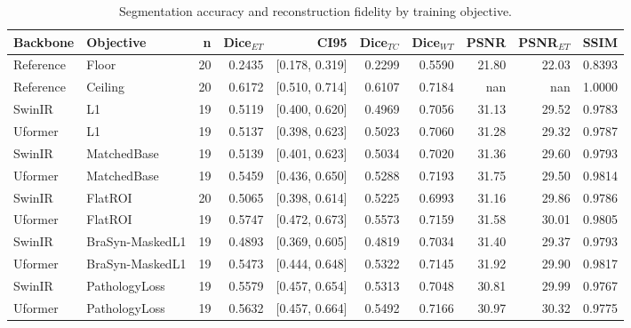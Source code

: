 \begin{table}[t]
\centering
\caption{Segmentation accuracy and reconstruction fidelity by training objective.}
\begin{tabular}{llrrrrrrrr}
\hline
Backbone & Objective & n & Dice$_{ET}$ & CI95 & Dice$_{TC}$ & Dice$_{WT}$ & PSNR & PSNR$_{ET}$ & SSIM \\
\hline
Reference & Floor & 20 & 0.2435 & [0.178, 0.319] & 0.2299 & 0.5590 & 21.80 & 22.03 & 0.8393 \\
Reference & Ceiling & 20 & 0.6172 & [0.510, 0.714] & 0.6107 & 0.7184 & nan & nan & 1.0000 \\
SwinIR & L1 & 19 & 0.5119 & [0.400, 0.620] & 0.4969 & 0.7056 & 31.13 & 29.52 & 0.9783 \\
Uformer & L1 & 19 & 0.5137 & [0.398, 0.623] & 0.5023 & 0.7060 & 31.28 & 29.32 & 0.9787 \\
SwinIR & MatchedBase & 19 & 0.5139 & [0.401, 0.623] & 0.5034 & 0.7020 & 31.36 & 29.60 & 0.9793 \\
Uformer & MatchedBase & 19 & 0.5459 & [0.436, 0.650] & 0.5288 & 0.7193 & 31.75 & 29.50 & 0.9814 \\
SwinIR & FlatROI & 20 & 0.5065 & [0.398, 0.614] & 0.5225 & 0.6993 & 31.16 & 29.86 & 0.9786 \\
Uformer & FlatROI & 19 & 0.5747 & [0.472, 0.673] & 0.5573 & 0.7159 & 31.58 & 30.01 & 0.9805 \\
SwinIR & BraSyn-MaskedL1 & 19 & 0.4893 & [0.369, 0.605] & 0.4819 & 0.7034 & 31.40 & 29.37 & 0.9793 \\
Uformer & BraSyn-MaskedL1 & 19 & 0.5473 & [0.444, 0.648] & 0.5322 & 0.7145 & 31.92 & 29.90 & 0.9817 \\
SwinIR & PathologyLoss & 19 & 0.5579 & [0.457, 0.654] & 0.5313 & 0.7048 & 30.81 & 29.99 & 0.9767 \\
Uformer & PathologyLoss & 19 & 0.5632 & [0.457, 0.664] & 0.5492 & 0.7166 & 30.97 & 30.32 & 0.9775 \\
\hline
\end{tabular}
\end{table}

